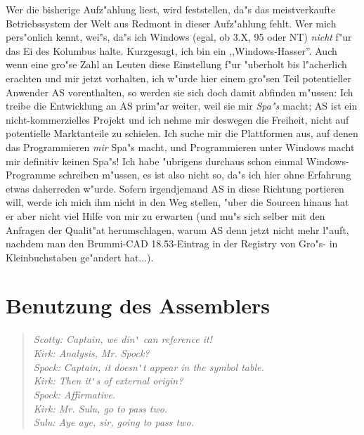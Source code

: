 \documentclass[12pt,a4paper,twoside]{report}
\begin{document}
Wer die bisherige  Aufz"ahlung liest, wird
feststellen, da"s das meistverkaufte Betriebssystem der Welt aus Redmont
in dieser Aufz"ahlung fehlt.  Wer mich pers"onlich kennt, wei"s, da"s ich
Windows (egal, ob 3.X, 95 oder NT) {\em nicht} f"ur das Ei des Kolumbus
halte.  Kurzgesagt, ich bin ein ,,Windows-Hasser''.  Auch wenn eine gro"se
Zahl an Leuten diese Einstellung f"ur "uberholt bis l"acherlich erachten
und mir jetzt vorhalten, ich w"urde hier einem gro"sen Teil potentieller
Anwender AS vorenthalten, so werden sie sich doch damit abfinden m"ussen:
Ich treibe die Entwicklung an AS prim"ar weiter, weil sie mir {\em Spa"s}
macht; AS ist ein nicht-kommerzielles Projekt und ich nehme mir deswegen
die Freiheit, nicht auf potentielle Marktanteile zu schielen.  Ich suche
mir die Plattformen aus, auf denen das Programmieren {\em mir} Spa"s
macht, und Programmieren unter Windows macht mir definitiv keinen Spa"s!
Ich habe "ubrigens durchaus schon einmal Windows-Programme schreiben
m"ussen, es ist also nicht so, da"s ich hier ohne Erfahrung etwas
daherreden w"urde.  Sofern irgendjemand AS in diese Richtung portieren
will, werde ich mich ihm nicht in den Weg stellen, "uber die Sourcen
hinaus hat er aber nicht viel Hilfe von mir zu erwarten (und mu"s sich
selber mit den Anfragen der Qualit"at herumschlagen, warum AS denn jetzt
nicht mehr l"auft, nachdem man den Brummi-CAD 18.53-Eintrag in der
Registry von Gro"s- in Kleinbuchstaben ge"andert hat...).


\cleardoublepage
\chapter{Benutzung des Assemblers}

\begin{quote}\begin{raggedright}{\it
Scotty: Captain, we din\verb!'! can reference it! \\
Kirk:   Analysis, Mr. Spock? \\
Spock:  Captain, it doesn\verb!'!t appear in the symbol table. \\
Kirk:   Then it\verb!'!s of external origin? \\
Spock:  Affirmative. \\
Kirk:   Mr. Sulu, go to pass two. \\
Sulu:   Aye aye, sir, going to pass two. \\
}\end{raggedright}\end{quote}
\end{document}
